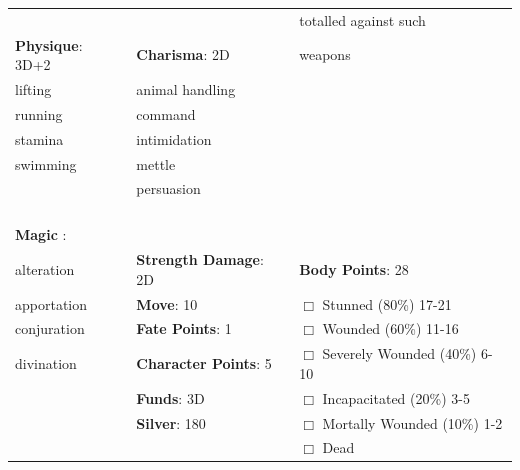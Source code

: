 \documentclass[10pt]{article}
\begin{document}
\begin{table}
\begin{tabular}{m{156pt} m{156pt} m{156pt}}
 \hrulefill &  \hrulefill & totalled against such \hrulefill \\


\textbf{Physique}: 3D+2 \hrulefill & \textbf{Charisma}: 2D \hrulefill     & weapons \hrulefill \\

lifting              \hrulefill & animal handling      \hrulefill &  \hrulefill \\

running              \hrulefill & command              \hrulefill &  \hrulefill \\

stamina              \hrulefill & intimidation         \hrulefill &  \hrulefill \\

swimming             \hrulefill & mettle               \hrulefill &  \hrulefill \\

 \hrulefill & persuasion           \hrulefill &  \hrulefill \\

 \hrulefill &  \hrulefill &  \hrulefill \\

 \hrulefill &  \hrulefill &  \hrulefill \\

 \hrulefill &  \hrulefill &  \hrulefill \\

                                  &                                 &                             \\
\textbf{Magic }:  \hrulefill  &                                 &                             \\
alteration           \hrulefill & \textbf{Strength Damage}: 2D \hrulefill                             & \textbf{Body Points}: 28 \hrulefill \\
apportation          \hrulefill                        & \textbf{Move}:             10             \hrulefill    & $\Box$ Stunned \footnotesize{(80\%)} \hfill 17-21 \\
conjuration          \hrulefill                        & \textbf{Fate Points}:      1      \hrulefill    & $\Box$ Wounded \footnotesize{(60\%)} \hfill 11-16 \\
divination           \hrulefill                        & \textbf{Character Points}: 5 \hrulefill    & $\Box$ Severely Wounded \footnotesize{(40\%)} \hfill 6-10 \\
 \hrulefill                        & \textbf{Funds}:            3D            \hrulefill    & $\Box$ Incapacitated \footnotesize{(20\%)} \hfill 3-5 \\
 \hrulefill                        & \textbf{Silver}:           180           \hrulefill    & $\Box$ Mortally Wounded \footnotesize{(10\%)} \hfill 1-2 \\
 \hrulefill                        &  \hrulefill                                                       & $\Box$ Dead   \\
\end{tabular}
\end{table}
\end{document}
